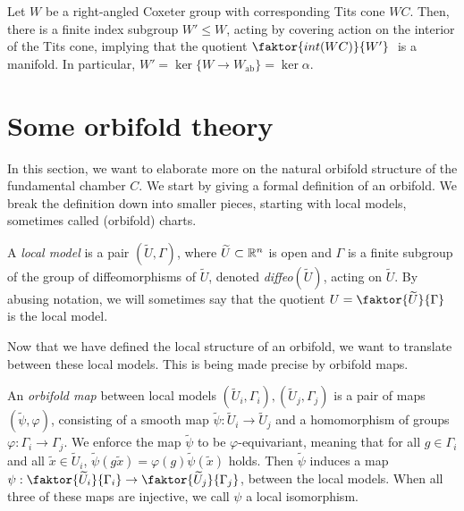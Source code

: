 \begin{proposition}
    Let \(W\) be a right-angled Coxeter group with corresponding Tits cone \(WC\). %
    Then, there is a finite index subgroup \(W' \leq W\), acting by covering action on the interior of the Tits cone, implying that the quotient \(\faktor{int(WC)}{W'}\;\) is a manifold.
    In particular, \(W' = \ker\{W \to W_{\text{ab}}\} = \ker\alpha\).
\end{proposition}


\section{Some orbifold theory}

In this section, we want to elaborate more on the natural orbifold structure of the fundamental chamber \(C\).
We start by giving a formal definition of an orbifold.
We break the definition down into smaller pieces, starting with local models, sometimes called (orbifold) charts.

\begin{definition}
    A \emph{local model} is a pair \((\widetilde{U}, \Gamma)\), where \(\widetilde{U} \subset \mathbb{R}^n\) is open and \(\Gamma\) is a finite subgroup of the group of diffeomorphisms of \(\widetilde{U}\), denoted \emph{diffeo}\((\widetilde{U})\), acting on \(\widetilde{U}\).
    By abusing notation, we will sometimes say that the quotient \(U = \faktor{\widetilde{U}}{\Gamma}\;\) is the local model.
\end{definition}

Now that we have defined the local structure of an orbifold, we want to translate between these local models.
This is being made precise by orbifold maps.

\begin{definition}
    An \emph{orbifold map} between local models \((\widetilde{U}_i, \Gamma_i), (\widetilde{U}_j, \Gamma_j)\) is a pair of maps \((\widetilde{\psi}, \varphi)\),
    consisting of a smooth map \(\widetilde{\psi} : \widetilde{U}_i \to \widetilde{U}_j\) and a homomorphism of groups \(\varphi : \Gamma_i \to \Gamma_j\).
    We enforce the map \(\widetilde{\psi}\) to be \(\varphi\)-equivariant, meaning that for all \(g \in \Gamma_i\) and all \(\widetilde{x} \in \widetilde{U}_i\), \(\widetilde{\psi}(g\widetilde{x}) = \varphi(g)\widetilde{\psi}(\widetilde{x})\) holds.
    Then \(\widetilde{\psi}\) induces a map \(\psi : \faktor{\widetilde{U}_i}{\Gamma_i} \to \faktor{\widetilde{U}_j}{\Gamma_j}\), between the local models.
    When all three of these maps are injective, we call \(\psi\) a local isomorphism.
\end{definition}

